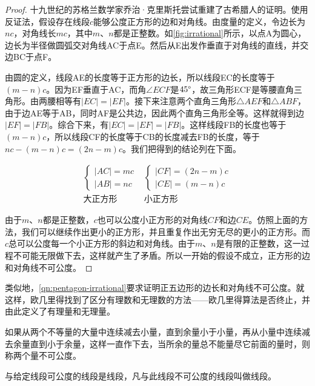 \documentclass[b5paper]{ctexart}
\begin{document}
\begin{proof}
十九世纪的苏格兰数学家乔治·克里斯托尝试重建了古希腊人的证明。使用反证法，假设存在线段$c$能够公度正方形的边和对角线。由度量的定义，令边长为$nc$，对角线长$mc$，其中$m$、$n$都是正整数。如\cref{fig:irrational}所示，以点A为圆心，边长为半径做圆弧交对角线AC于点E。然后从E出发作垂直于对角线的直线，并交边BC于点F。

由圆的定义，线段AE的长度等于正方形的边长，所以线段EC的长度等于$(m - n)c$。因为EF垂直于AC，而角$\angle ECF$是$45\degree$，故三角形ECF是等腰直角三角形。由两腰相等有$|EC| = |EF|$。接下来注意两个直角三角形$\triangle AEF$和$\triangle ABF$，由于边AE等于AB，同时AF是公共边，因此两个直角三角形全等。这样就得到边$|EF| = |FB|$。综合下来，有$|EC| = |EF| = |FB|$。这样线段FB的长度也等于$(m - n)c$，所以线段CF的长度等于CB的长度减去FB的长度，等于$nc - (m - n)c = (2n - m)c$。我们把得到的结论列在下面。

\[
\begin{array}{c|c}
\begin{cases}
|AC| = mc \\
|AB| = nc
\end{cases} &
\begin{cases}
|CF| = (2n - m)c \\
|CE| = (m - n)c
\end{cases} \\[4ex]
\text{大正方形} & \text{小正方形}
\end{array}
\]

由于$m$、$n$都是正整数，$c$也可以公度小正方形的对角线$CF$和边$CE$。仿照上面的方法，我们可以继续作出更小的正方形，并且重复作出无穷无尽的更小的正方形。而$c$总可以公度每一个小正方形的斜边和对角线。由于$m$、$n$是有限的正整数，这一过程不可能无限做下去，这样就产生了矛盾。所以一开始的假设不成立，正方形的边和对角线不可公度。
\end{proof}

类似地，\cref{qn:pentagon-irrational}要求证明正五边形的边长和对角线不可公度。就这样，欧几里得找到了区分有理数和无理数的方法——欧几里得算法是否终止，并由此定义了有理量和无理量。

\begin{proposition}[《原本》，卷十，命题2] \label{th:irrational-gcm}
如果从两个不等量的大量中连续减去小量，直到余量小于小量，再从小量中连续减去余量直到小于余量，这样一直作下去，当所余的量总不能量尽它前面的量时，则称两个量不可公度。
\end{proposition}

\begin{definition}[《原本》，卷十，定义3]
与给定线段可公度的线段是线段，凡与此线段不可公度的线段叫做线段。
\end{definition}
\end{document}
